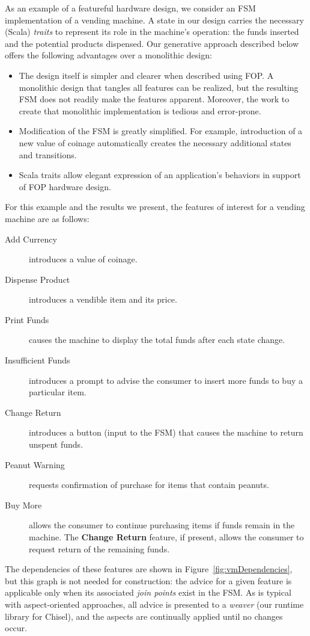 \documentclass[sigplan,anonymous,review]{acmart}
\begin{document}
As an example of a featureful hardware design, we consider an FSM implementation of a vending machine.   A state in our design carries the necessary (Scala) \emph{traits} to represent its role in the machine's operation:  the funds inserted and the potential products dispensed.  Our generative approach described below offers the following advantages over a monolithic design:
\begin{itemize}
    \item The design itself is simpler and clearer when described using FOP.  A monolithic design that tangles all features can be realized, but the resulting FSM does not readily make the features apparent.  Moreover, the work to create that monolithic implementation is tedious and error-prone.
    \item Modification of the FSM is greatly simplified.  For example, introduction of a new value of coinage automatically creates the necessary additional states and transitions.
    \item Scala traits allow elegant expression of an application's behaviors in support of FOP hardware design.
\end{itemize}
For this example and the results we present, the features of interest for a vending machine are as follows:
\begin{description}
    \item[Add Currency] introduces a value of coinage.
    \item[Dispense Product] introduces a vendible item and its price.
    \item[Print Funds] causes the machine to display the total funds after each state change.
    \item[Insufficient Funds] introduces a prompt to advise the consumer to insert more funds to buy a particular item.
    \item[Change Return] introduces a button (input to the FSM) that causes the machine to return unspent funds.
    \item[Peanut Warning] requests confirmation of purchase for items that contain peanuts.
    \item[Buy More] allows the consumer to continue purchasing items if funds remain in the machine.  The \textbf{Change Return} feature, if present, allows the consumer to request return of the remaining funds.
\end{description}
The dependencies of these features are shown in Figure~\ref{fig:vmDependencies}, but this graph is not needed for construction:  the advice for a given feature is applicable only when its associated \emph{join points} exist in the FSM.  As is typical with aspect-oriented approaches, all advice is presented to a \emph{weaver} (our runtime library for Chisel), and the aspects are continually applied until no changes occur.
\end{document}
